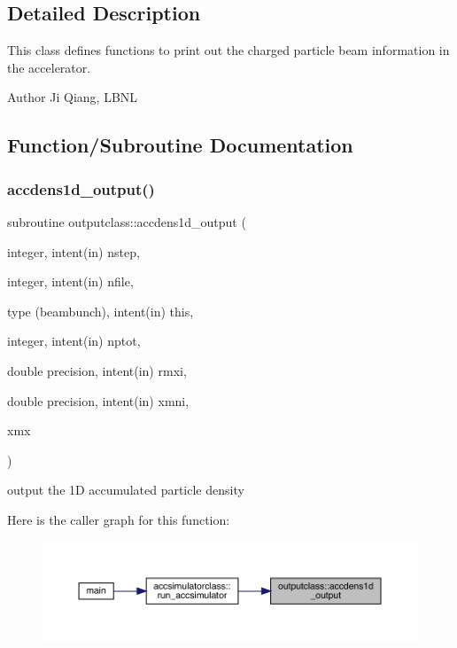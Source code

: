 \subsection{Detailed Description}
This class defines functions to print out the charged particle beam information in the accelerator. 

\begin{DoxyAuthor}{Author}
Ji Qiang, L\+B\+NL 
\end{DoxyAuthor}


\subsection{Function/\+Subroutine Documentation}
\mbox{\label{namespaceoutputclass_ac66061da2efec314c456fc5e7ed4fc8b}} 
\subsubsection{\texorpdfstring{accdens1d\_output()}{accdens1d\_output()}}
{\footnotesize\ttfamily subroutine outputclass\+::accdens1d\+\_\+output (\begin{DoxyParamCaption}\item[{integer, intent(in)}]{nstep,  }\item[{integer, intent(in)}]{nfile,  }\item[{type (beambunch), intent(in)}]{this,  }\item[{integer, intent(in)}]{nptot,  }\item[{double precision, intent(in)}]{rmxi,  }\item[{double precision, intent(in)}]{xmni,  }\item[{}]{xmx }\end{DoxyParamCaption})}



output the 1D accumulated particle density 

Here is the caller graph for this function\+:\nopagebreak
\begin{figure}[H]
\begin{center}
\leavevmode
\includegraphics[width=350pt]{namespaceoutputclass_ac66061da2efec314c456fc5e7ed4fc8b_icgraph}
\end{center}
\end{figure}
\mbox{\label{namespaceoutputclass_acc8a8c481be8eb7a7ebb49852db14185}} 
